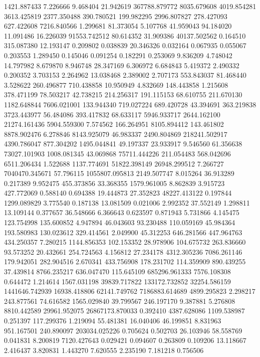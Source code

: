 1421.887433
7.226666
9.468404
21.942619
367788.879772
8035.679608
4019.854281
3613.425819
2377.350488
390.780521
199.982295
2996.807827
278.427093
627.422608
7216.840566
1.299681
81.373054
5.107768
41.959043
94.184020
11.091486
16.226039
91553.742512
80.614352
31.909386
40137.502562
0.164510
315.087380
12.193147
0.209802
0.038839
20.346326
0.032164
0.067935
0.055067
0.203553
1.289450
0.145046
0.091254
0.182291
0.253069
9.836209
4.748042
14.797982
8.679870
8.946748
28.347169
6.306972
6.684843
5.419372
2.490332
0.200352
3.703153
2.264962
13.038468
2.389002
2.707173
553.843037
81.468440
3.528622
260.496877
710.438858
10.950949
4.832669
148.443858
1.215608
378.471199
78.503217
42.738215
214.256317
191.115153
68.610755
211.670130
1182.648844
7606.021001
133.944340
719.027224
689.420728
43.394691
363.219838
3723.443977
56.484086
393.417832
68.633117
5946.933717
2644.162100
21274.161436
5904.559300
7.574562
166.264951
8105.894412
143.461802
8878.902476
6.278846
8143.925079
46.983337
2490.804869
218241.502917
4390.786047
877.304202
1495.044841
49.197337
23.933917
9.546560
61.356638
73027.101903
1008.081345
43.069868
75711.444226
211.054483
568.042696
6511.206434
1.522688
1137.774691
51822.398149
26948.299512
7.266727
7040470.345671
57.796115
1055807.095813
2149.507747
8.015264
36.913289
0.217389
9.952475
455.373856
33.368355
1579.961005
8.862839
3.915723
427.772069
0.588140
0.694388
19.444873
27.352823
48227.413122
0.197844
1299.089829
3.775540
0.187138
13.081509
0.021006
2.992352
37.552149
1.298811
13.109144
0.377657
36.548666
6.366643
0.623597
0.871943
5.731866
4.145475
123.754998
135.600852
4.947894
46.043603
93.230488
110.059169
45.984364
193.580983
130.023612
329.414561
2.049900
45.312253
646.281566
447.964763
434.250357
7.280215
1144.856353
102.153352
28.978906
104.675732
263.836660
93.573252
20.432661
254.724563
4.156812
27.234178
4312.305236
7086.261146
179.942051
282.904516
2.670341
433.756908
178.231702
114.359909
890.439255
37.439814
8766.235217
636.047470
115.645109
685296.961333
7576.108308
0.644472
1.214614
1567.031198
39839.717822
133172.732852
32254.586159
1441646.742939
16938.418806
62141.749762
7186883.614689
4899.295823
2.298217
243.877561
74.616582
1565.029840
39.799567
246.197170
9.387881
5.276808
8810.442589
29961.952075
26867173.870033
0.392410
4387.628086
1109.538987
0.251397
117.299376
1.219094
55.481381
16.040406
46.199851
8.831963
951.167501
240.890097
203034.025226
0.705624
0.502703
26.103946
58.558769
0.041831
8.200819
7120.427643
0.029421
0.094607
0.263809
0.109206
13.118667
2.416437
3.820831
1.443270
7.620555
2.235190
7.181218
0.756506
